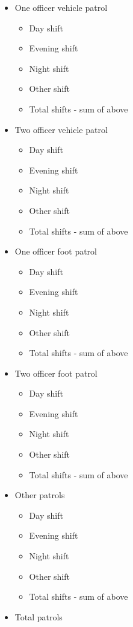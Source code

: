 \documentclass[
  12pt,
  openany]{book}
\providecommand{\tightlist}{%
  \setlength{\itemsep}{0pt}\setlength{\parskip}{0pt}}
\begin{document}
\begin{itemize}
\tightlist
\item
  One officer vehicle patrol

  \begin{itemize}
  \tightlist
  \item
    Day shift
  \item
    Evening shift
  \item
    Night shift
  \item
    Other shift
  \item
    Total shifts - sum of above
  \end{itemize}
\item
  Two officer vehicle patrol

  \begin{itemize}
  \tightlist
  \item
    Day shift
  \item
    Evening shift
  \item
    Night shift
  \item
    Other shift
  \item
    Total shifts - sum of above
  \end{itemize}
\item
  One officer foot patrol

  \begin{itemize}
  \tightlist
  \item
    Day shift
  \item
    Evening shift
  \item
    Night shift
  \item
    Other shift
  \item
    Total shifts - sum of above
  \end{itemize}
\item
  Two officer foot patrol

  \begin{itemize}
  \tightlist
  \item
    Day shift
  \item
    Evening shift
  \item
    Night shift
  \item
    Other shift
  \item
    Total shifts - sum of above
  \end{itemize}
\item
  Other patrols

  \begin{itemize}
  \tightlist
  \item
    Day shift
  \item
    Evening shift
  \item
    Night shift
  \item
    Other shift
  \item
    Total shifts - sum of above
  \end{itemize}
\item
  Total patrols


\end{itemize}
\end{document}
